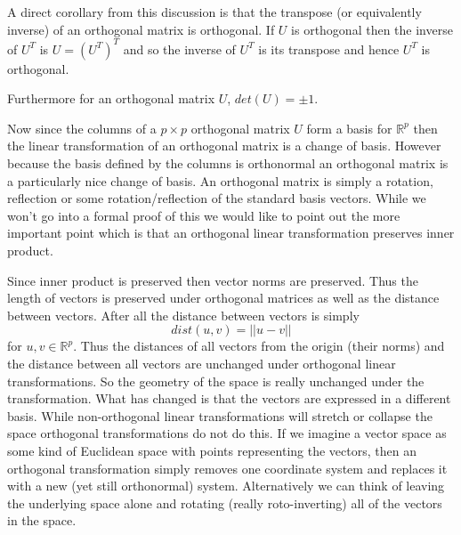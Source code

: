 \documentclass{book}
\begin{document}
A direct corollary from this discussion is that the transpose (or equivalently inverse) of an orthogonal matrix is orthogonal. If $U$ is orthogonal then the inverse of $U^T$ is $U=(U^T)^T$ and so the inverse of $U^T$ is its transpose and hence $U^T$ is orthogonal. 

Furthermore for an orthogonal matrix $U$, $det(U)=\pm 1$.

\newpage
{}

Now since the columns of a $p \times p$ orthogonal matrix $U$ form a basis for $\mathbb{R}^p$ then the linear transformation of an orthogonal matrix is a change of basis. However because the basis defined by the columns is orthonormal an orthogonal matrix is a particularly nice change of basis. An orthogonal matrix is simply a rotation, reflection or some rotation/reflection of the standard basis vectors. While we won't go into a formal proof of this we would like to point out the more important point which is that an orthogonal linear transformation preserves inner product.



Since inner product is preserved then vector norms are preserved. Thus the length of vectors is preserved under orthogonal matrices as well as the distance between vectors. After all the distance between vectors is simply
$$
dist(u,v)=||u-v||
$$
for $u,v \in \mathbb{R}^p$. Thus the distances of all vectors from the origin (their norms) and the distance between all vectors are unchanged under orthogonal linear transformations. So the geometry of the space is really unchanged under the transformation. What has changed is that the vectors are expressed in a different basis. While non-orthogonal linear transformations will stretch or collapse the space orthogonal transformations do not do this. If we imagine a vector space as some kind of Euclidean space with points representing the vectors, then an orthogonal transformation simply removes one coordinate system and replaces it with a new (yet still orthonormal) system. Alternatively we can think of leaving the underlying space alone and rotating (really roto-inverting) all of the vectors in the space. 
\end{document}
